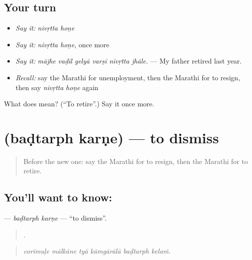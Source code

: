 \subsection*{Your turn}
\begin{itemize}
\raggedright
  \item \emph{Say it:} \emph{nivṛtta hoṇe}
  \item \emph{Say it:} \emph{nivṛtta hoṇe}, once more
  \item \emph{Say it:} \emph{mājhe vaḍīl gelyā varṣī nivṛtta jhāle.} — My father retired last year.
  \item \emph{Recall:} say the Marathi for unemployment, then the Marathi for to resign, then say \emph{nivṛtta hoṇe} again
\end{itemize}

\begin{tcolorbox}[breakable,colback=teal!4,colframe=teal!35!black,title={Before you move on}]
What does   mean? (\textquotedblleft{}To retire\textquotedblright{}.) Say it once more.
\end{tcolorbox}
\section[\texorpdfstring{\mr{बडतर्फ} \mr{करणे} (baḍtarph karṇe)}{बडतर्फ करणे (baḍtarph karṇe)}]{  (baḍtarph karṇe) — to dismiss}

\label{lesson:MR-C510-badtarph-karne}



\begin{quote}
Before the new one: say the Marathi for to resign, then the Marathi for to retire.
\end{quote}

\subsection*{You'll want to know:  }
\textbf{ } — \emph{baḍtarph karṇe} — \textquotedblleft{}to dismiss\textquotedblright{}.

\begin{quote}
     .
\end{quote}

\begin{quote}
\emph{corīmuḷe mālkāne tyā kāmgārālā baḍtarph kelaṁ.}
\end{quote}


